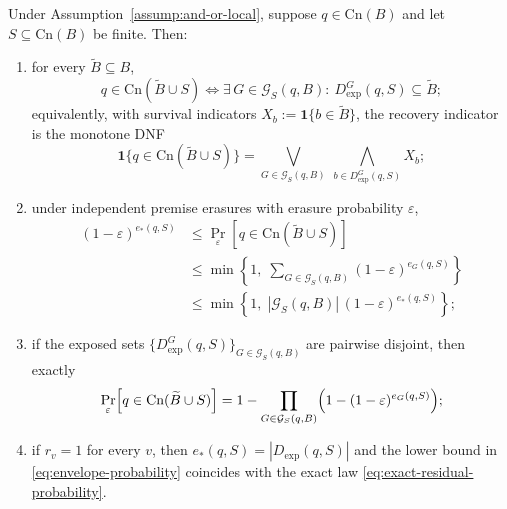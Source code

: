 \documentclass[10pt,a4paper]{amsart}
\newcommand{\Cn}{\text{Cn}}
\begin{document}
\begin{theorem}
\label{thm:envelope-rigidity}
Under Assumption~\ref{assump:and-or-local}, suppose \(q\in\Cn(B)\) and let
\(S\subseteq\Cn(B)\) be finite.  Then:
\begin{enumerate}[label=\textup{(\alph*)}]
\item for every \(\widetilde B\subseteq B\),
\begin{equation}
  q\in\Cn(\widetilde B\cup S)
  \Longleftrightarrow
  \exists\,G\in\mathcal G_S(q,B):
  \ D_{\mathrm{exp}}^{G}(q,S)\subseteq\widetilde B;
\label{eq:envelope-event}
\end{equation}
equivalently, with survival indicators
\(X_b:=\mathbf 1\{b\in\widetilde B\}\), the recovery indicator is the
monotone DNF
\begin{equation}
  \mathbf 1\{q\in\Cn(\widetilde B\cup S)\}
  =
  \bigvee_{G\in\mathcal G_S(q,B)}
  \ \bigwedge_{b\in D_{\mathrm{exp}}^{G}(q,S)} X_b;
\label{eq:envelope-dnf}
\end{equation}
\item under independent premise erasures with erasure probability
\(\varepsilon\),
\begin{align}
  (1-\varepsilon)^{e_*(q,S)}
  &\le
  \Pr_{\varepsilon}\!\left[q\in\Cn(\widetilde B\cup S)\right]
  \nonumber\\
  &\le
  \min\!\left\{
    1,\;
    \sum_{G\in\mathcal G_S(q,B)}(1-\varepsilon)^{e_G(q,S)}
  \right\}
  \nonumber\\
  &\le
  \min\!\left\{
    1,\;
    |\mathcal G_S(q,B)|\,(1-\varepsilon)^{e_*(q,S)}
  \right\};
\label{eq:envelope-probability}
\end{align}
\item if the exposed sets
\(\{D_{\mathrm{exp}}^{G}(q,S)\}_{G\in\mathcal G_S(q,B)}\) are pairwise
disjoint, then exactly
\begin{equation}
  \Pr_{\varepsilon}\!\left[q\in\Cn(\widetilde B\cup S)\right]
  =
  1-\prod_{G\in\mathcal G_S(q,B)}
  \Bigl(1-(1-\varepsilon)^{e_G(q,S)}\Bigr);
\label{eq:envelope-independent}
\end{equation}
\item if \(r_v=1\) for every \(v\), then \(e_*(q,S)=|D_{\mathrm{exp}}(q,S)|\)
and the lower bound in \eqref{eq:envelope-probability} coincides with the
exact law \eqref{eq:exact-residual-probability}.
\end{enumerate}
\end{theorem}
\end{document}
